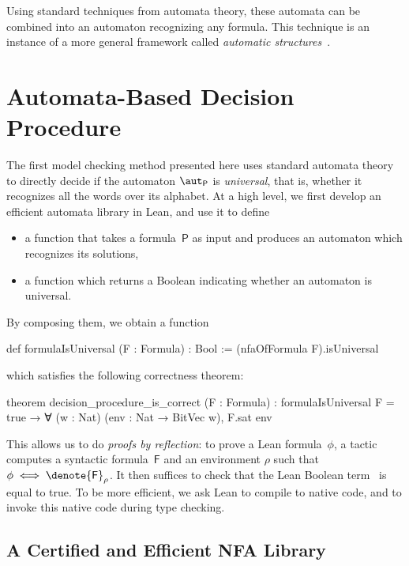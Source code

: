 %
Using standard techniques from automata theory, these automata can be combined
into an automaton recognizing any formula.
%
This technique is an instance of a more general framework called \emph{automatic
structures}~\citep{automatic-structures}.

\section{Automata-Based Decision Procedure}
\label{sec:swbv:automata}

The first model checking method presented here uses standard automata theory to
directly decide if the automaton $\aut_{\mathsf{P}}$ is \emph{universal}, that
is, whether it recognizes all the words over its alphabet.
%
At a high level, we first develop an efficient automata library in Lean, and
use it to define
\begin{itemize}
  \item a function  that takes a
    formula~$\mathsf{P}$ as input and produces an automaton which recognizes its
    solutions,
  \item a function  which returns a Boolean
    indicating whether an automaton is universal.
\end{itemize}
%
By composing them, we obtain a function
\begin{lean}
  def formulaIsUniversal (F : Formula) : Bool :=
    (nfaOfFormula F).isUniversal
\end{lean}
which satisfies the following correctness theorem:

\begin{lean}
  theorem decision_procedure_is_correct (F : Formula) :
      formulaIsUniversal F = true → ∀ (w : Nat) (env : Nat → BitVec w), F.sat env
\end{lean}

This allows us to do \emph{proofs by reflection}: to prove a Lean
formula~$\phi$, a tactic computes a syntactic formula~$\mathsf{F}$ and an
environment $\rho$ such that $\phi \iff \denote{\mathsf{F}}_\rho$.
%
It then suffices to check that the Lean Boolean
term~ is equal to true.
%
To be more efficient, we ask Lean to compile
 to native code, and to invoke this native
code during type checking.

\subsection{A Certified and Efficient NFA Library}

